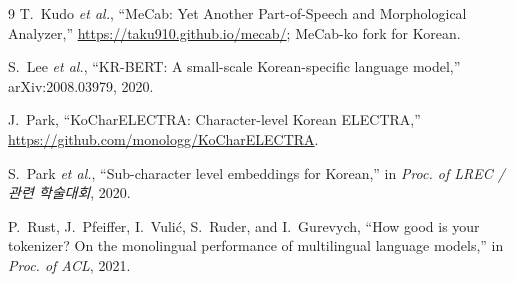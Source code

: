\documentclass[sigconf,nonacm]{acmart}
\begin{document}
\begin{thebibliography}{9}
T.~Kudo \emph{et al.},
``MeCab: Yet Another Part-of-Speech and Morphological Analyzer,''
\url{https://taku910.github.io/mecab/}; MeCab-ko fork for Korean.

S.~Lee \emph{et al.},
``KR-BERT: A small-scale Korean-specific language model,''
arXiv:2008.03979, 2020.

J.~Park,
``KoCharELECTRA: Character-level Korean ELECTRA,''
\url{https://github.com/monologg/KoCharELECTRA}.

S.~Park \emph{et al.},
``Sub-character level embeddings for Korean,''
in \emph{Proc. of LREC / 관련 학술대회}, 2020.

P.~Rust, J.~Pfeiffer, I.~Vulić, S.~Ruder, and I.~Gurevych,
``How good is your tokenizer? On the monolingual performance of multilingual language models,''
in \emph{Proc. of ACL}, 2021.

\end{thebibliography}
\end{document}
